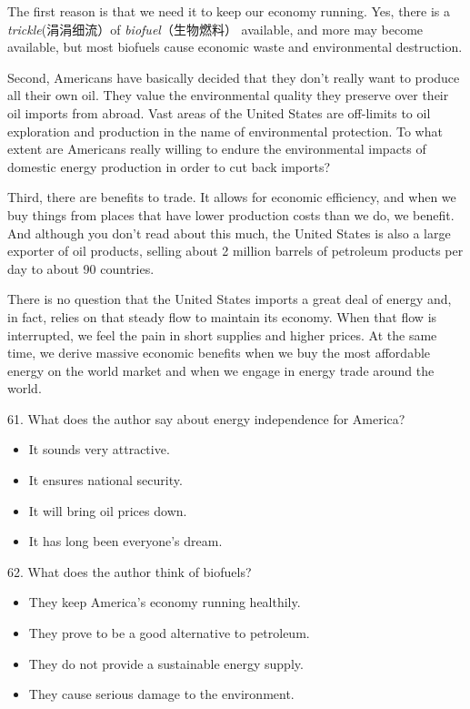 \documentclass[UTF8,11pt]{ctexart}
\begin{document}
The first reason is that we need it to keep our economy running. Yes, there is a\textit{ trickle}(涓涓细流）of\textit{ biofuel}（生物燃料） available, and more may become available, but most biofuels cause economic waste and environmental destruction.


Second, Americans have basically decided that they don’t really want to produce all their own oil. They value the environmental quality they preserve over their oil imports from abroad. Vast areas of the United States are off-limits to oil exploration and production in the name of environmental protection. To what extent are Americans really willing to endure the environmental impacts of domestic energy production in order to cut back imports?


Third, there are benefits to trade. It allows for economic efficiency, and when we buy things from places that have lower production costs than we do, we benefit. And although you don’t read about this much, the United States is also a large exporter of oil products, selling about 2 million barrels of petroleum products per day to about 90 countries.


There is no question that the United States imports a great deal of energy and, in fact, relies on that steady flow to maintain its economy. When that flow is interrupted, we feel the pain in short supplies and higher prices. At the same time, we derive massive economic benefits when we buy the most affordable energy on the world market and when we engage in energy trade around the world.


61. What does the author say about energy independence for America?


\begin{itemize}[leftmargin=2em,itemsep=.2em,topsep=.4em]\item[A.] It sounds very attractive.
\item[B.] It ensures national security.
\item[C.] It will bring oil prices down.
\item[D.] It has long been everyone’s dream.
\end{itemize}

62. What does the author think of biofuels?


\begin{itemize}[leftmargin=2em,itemsep=.2em,topsep=.4em]\item[A.] They keep America’s economy running healthily.
\item[B.] They prove to be a good alternative to petroleum.
\item[C.] They do not provide a sustainable energy supply.
\item[D.] They cause serious damage to the environment.
\end{itemize}
\end{document}
